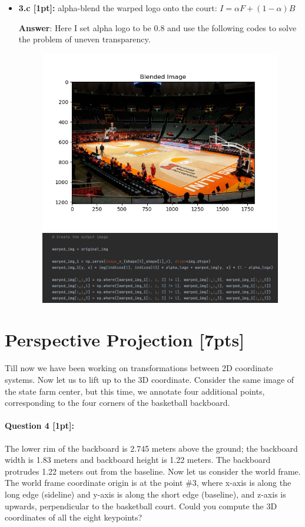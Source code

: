 \documentclass[11pt]{article}
\begin{document}
\begin{itemize}
\item \textbf{3.c [1pt]:} alpha-blend the warped logo onto the court: $I = \alpha F + (1 - \alpha) B$

\textbf{Answer}: Here I set alpha logo to be 0.8 and use the following codes to solve the problem of uneven transparency.

\begin{figure}[htbp]
    \small
    \includegraphics[width=0.48\linewidth]{fig/blended_image.png}
    \includegraphics[width=0.6\linewidth]{fig/codes.png}
\end{figure}

\end{itemize}



\section*{Perspective Projection [7pts]}
Till now we have been working on transformations between 2D coordinate systems. Now let us to lift up to the 3D coordinate. Consider the same image of the state farm center, but this time, we annotate four additional points, corresponding to the four corners of the basketball backboard. 

\paragraph{Question 4 [1pt]:} 
The lower rim of the backboard is 2.745 meters above the ground; the backboard width is 1.83 meters and backboard height is 1.22 meters. The backboard protrudes 1.22 meters out from the baseline. Now let us consider the world frame. The world frame coordinate origin is at the point \#3, where x-axis is along the long edge (sideline) and y-axis is along the short edge (baseline), and z-axis is upwards, perpendicular to the basketball court.   Could you compute the 3D coordinates of all the eight keypoints?
\end{document}

